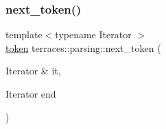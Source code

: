 \subsubsection{\texorpdfstring{next\+\_\+token()}{next\_token()}}
{\footnotesize\ttfamily template$<$typename Iterator $>$ \\
\hyperlink{structterraces_1_1parsing_1_1token}{token} terraces\+::parsing\+::next\+\_\+token (\begin{DoxyParamCaption}\item[{Iterator \&}]{it,  }\item[{Iterator}]{end }\end{DoxyParamCaption})}


